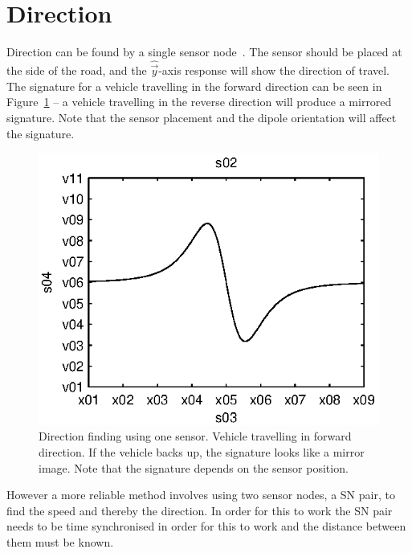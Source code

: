 \section{Direction}
Direction can be found by a single sensor node~\cite{an218}. The sensor should be placed at the side of the road, and the $\hat{\vec{y}}$-axis response will show the direction of travel. The signature for a vehicle travelling in the forward direction can be seen in Figure~\ref{fig:direction} -- a vehicle travelling in the reverse direction will produce a mirrored signature. Note that the sensor placement and the dipole orientation will affect the signature.

\begin{figure}[bhtf]
 \centering
 \begin{minipage}{0.6\linewidth}
 \centering
 
 \includegraphics[width=1\linewidth]{images/direction}
 \caption[Direction finding using one sensor]{Direction finding using one sensor. Vehicle travelling in forward direction. If the vehicle backs up, the signature looks like a mirror image. Note that the signature depends on the sensor position.}
 \label{fig:direction}
 \end{minipage}
\end{figure}

However a more reliable method involves using two sensor nodes, a SN pair, to find the speed and thereby the direction. In order for this to work the SN pair needs to be time synchronised in order for this to work and the distance between them must be known.

